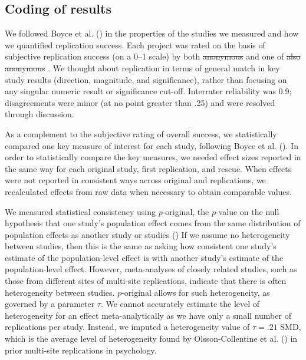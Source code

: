 \documentclass[
  english,
  a4paper,
]{article}
\providecommand{\DIFaddtex}[1]{{\protect\color{blue}\uwave{#1}}} %
\providecommand{\DIFdeltex}[1]{{\protect\color{red}\sout{#1}}}                      %
\providecommand{\DIFaddbegin}{} %
\providecommand{\DIFaddend}{} %
\providecommand{\DIFdelbegin}{} %
\providecommand{\DIFdelend}{} %
\providecommand{\DIFadd}[1]{\texorpdfstring{\DIFaddtex{#1}}{#1}} %
\providecommand{\DIFdel}[1]{\texorpdfstring{\DIFdeltex{#1}}{}} %
\newcommand{\DIFscaledelfig}{0.5}
\newlength{\DIFdelgraphicswidth} %
\newlength{\DIFdelgraphicsheight} %
\newcommand{\DIFaddincludegraphics}[2][]{{\color{blue}\fbox{\DIFOincludegraphics[#1]{#2}}}} %
\newcommand{\DIFdelincludegraphics}[2][]{%
\sbox{\DIFdelgraphicsbox}{\DIFOincludegraphics[#1]{#2}}%
\settoboxwidth{\DIFdelgraphicswidth}{\DIFdelgraphicsbox} %
\settoboxtotalheight{\DIFdelgraphicsheight}{\DIFdelgraphicsbox} %
\scalebox{\DIFscaledelfig}{%
\parbox[b]{\DIFdelgraphicswidth}{\usebox{\DIFdelgraphicsbox}\\[-\baselineskip] \rule{\DIFdelgraphicswidth}{0em}}\llap{\resizebox{\DIFdelgraphicswidth}{\DIFdelgraphicsheight}{%
\setlength{\unitlength}{\DIFdelgraphicswidth}%
\begin{picture}(1,1)%
\thicklines\linethickness{2pt} %
{\color[rgb]{1,0,0}\put(0,0){\framebox(1,1){}}}%
{\color[rgb]{1,0,0}\put(0,0){\line( 1,1){1}}}%
{\color[rgb]{1,0,0}\put(0,1){\line(1,-1){1}}}%
\end{picture}%
}\hspace*{3pt}}} %
} %
\DeclareRobustCommand{\DIFaddbegin}{\DIFOaddbegin \let\includegraphics\DIFaddincludegraphics} %
\DeclareRobustCommand{\DIFaddend}{\DIFOaddend \let\includegraphics\DIFOincludegraphics} %
\DeclareRobustCommand{\DIFdelbegin}{\DIFOdelbegin \let\includegraphics\DIFdelincludegraphics} %
\DeclareRobustCommand{\DIFdelend}{\DIFOaddend \let\includegraphics\DIFOincludegraphics} %
\begin{document}
\subsection{Coding of results}\label{coding-of-results}

We followed Boyce et al. () in the properties of the studies we measured and how we quantified replication success.
Each project was rated on the basis of subjective replication success (on a 0--1 scale) by both \DIFdelbegin %
\DIFdel{anonymous}%
\DIFdelend \DIFaddbegin \DIFadd{MCF }\DIFaddend and one of \DIFdelbegin %
\DIFdel{also anonymous}%
\DIFdelend \DIFaddbegin \DIFadd{VB and BP}\DIFaddend .
We thought about replication in terms of general match in key study results (direction, magnitude, and significance), rather than focusing on any singular numeric result or significance cut-off.
Interrater reliability was 0.9; disagreements were minor (at no point greater than .25) and were resolved through discussion.

As a complement to the subjective rating of overall success, we statistically compared one key measure of interest for each study, following Boyce et al. ().
In order to statistically compare the key measures, we needed effect sizes reported in the same way for each original study, first replication, and rescue.
When effects were not reported in consistent ways across original and replications, we recalculated effects from raw data when necessary to obtain comparable values.

We measured statistical consistency using \(p\)-original, the \(p\)-value on the null hypothesis that one study's population effect comes from the same distribution of population effects as another study or studies () If we assume no heterogeneity between studies, then this is the same as asking how consistent one study's estimate of the population-level effect is with another study's estimate of the population-level effect.
However, meta-analyses of closely related studies, such as those from different sites of multi-site replications, indicate that there is often heterogeneity between studies.
\(p\)-original allows for such heterogeneity, as governed by a parameter \(\tau\).
We cannot accurately estimate the level of heterogeneity for an effect meta-analytically as we have only a small number of replications per study.
Instead, we imputed a heterogeneity value of \(\tau=.21\) SMD, which is the average level of heterogeneity found by Olsson-Collentine et al. () in prior multi-site replications in psychology.
\end{document}
